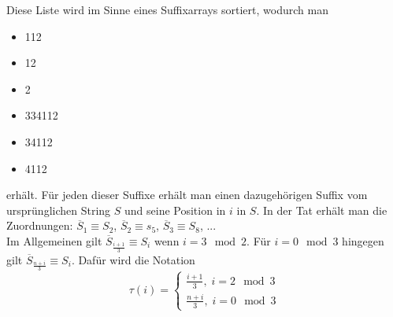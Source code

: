 \documentclass[a4paper, 12pt]{article}
\theoremstyle{plain}
\theoremstyle{definition}
\theoremstyle{lemma}
\theoremstyle{remark}
\theoremstyle{corollary}
\theoremstyle{example}
\begin{document}
	Diese Liste wird im Sinne eines Suffixarrays sortiert, wodurch man \begin{itemize}
		\item 112
		\item 12
		\item 2
		\item 334112
		\item 34112
		\item 4112
	\end{itemize} 
	erhält. Für jeden dieser Suffixe erhält man einen dazugehörigen Suffix vom ursprünglichen String $S$ und seine Position in $i$ in $S$. In der Tat erhält man die Zuordnungen: $\overline{S}_1 \equiv S_2$, $\overline{S}_2 \equiv s_5$, $\overline{S}_3 \equiv S_8$, ... \\
	Im Allgemeinen gilt $\overline{S}_{\frac{i+1}{3}} \equiv S_i$ wenn $i = 3 \mod 2$. Für $i = 0 \mod 3$ hingegen gilt $\overline{S}_{\frac{n+i}{3}} \equiv S_i$. Dafür wird die Notation \[\tau(i) = \begin{cases}
		\frac{i+1}{3}, \; i = 2 \mod 3\\
		\frac{n+i}{3}, \; i = 0 \mod 3
	\end{cases}\]
\end{document}

